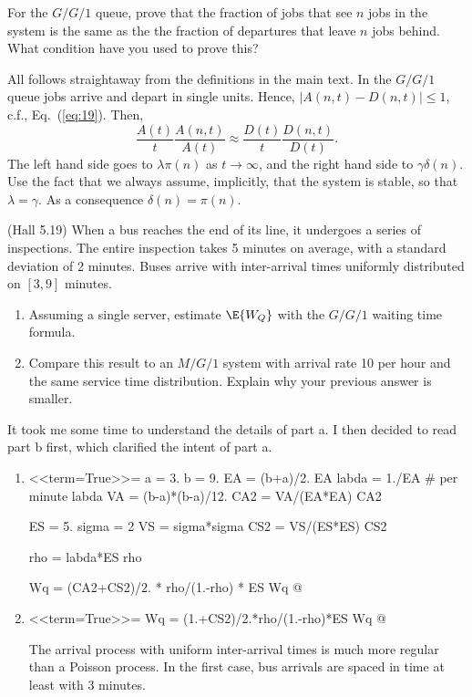 \begin{question}
  For the $G/G/1$ queue, prove that the fraction of jobs that see $n$
  jobs in the system is the same as the the fraction of departures that
  leave $n$ jobs behind. What condition have you used to prove this?
  \begin{solution}
    All follows straightaway from the definitions in the main text. In
    the $G/G/1$ queue jobs arrive and depart in single units. Hence,
    $|A(n,t)-D(n,t)|\leq 1$, c.f., Eq.~(\ref{eq:19}). Then, 
    \begin{equation*}
      \frac{A(t)}{t}\frac{A(n,t)}{A(t)} \approx 
      \frac{D(t)}{t}\frac{D(n,t)}{D(t)}. 
    \end{equation*}
    The left hand side goes to $\lambda \pi(n)$ as $t\to\infty$, and
    the right hand side to $\gamma \delta(n)$. Use the fact that we
    always assume, implicitly, that the system is stable, so that
    $\lambda = \gamma$. As a consequence $\delta(n) = \pi(n)$.
  \end{solution}
\end{question}

\begin{question}
  (Hall 5.19) When a bus reaches the end of its line, it undergoes a
  series of inspections. The entire inspection takes 5 minutes on
  average, with a standard deviation of 2 minutes. Buses arrive with
  inter-arrival times uniformly distributed on $[3,9]$ minutes.
  \begin{enumerate}
  \item Assuming a single server, estimate $\E{W_Q}$ with the $G/G/1$ waiting time formula.
  \item Compare this result to an $M/G/1$ system with arrival rate 10 per hour and the same service time distribution. Explain why your previous answer is smaller. 
  \end{enumerate}
  \begin{solution}
      It took me some time to understand the details of part a. I then
decided to read part b first, which clarified the intent of part a.
\begin{enumerate}
\item 
<<term=True>>=
a = 3.
b = 9. 
EA = (b+a)/2.
EA
labda = 1./EA # per minute
labda
VA = (b-a)*(b-a)/12.
CA2 = VA/(EA*EA)
CA2

ES = 5.
sigma = 2
VS = sigma*sigma
CS2 = VS/(ES*ES)
CS2

rho = labda*ES
rho

Wq = (CA2+CS2)/2. * rho/(1.-rho) * ES
Wq
@

\item 
<<term=True>>=
Wq = (1.+CS2)/2.*rho/(1.-rho)*ES
Wq
@

The arrival process with uniform inter-arrival times is much more
regular than a Poisson process. In the first case, bus arrivals are
spaced in time at least with 3 minutes.
  \end{enumerate}
    \end{solution}
\end{question}



